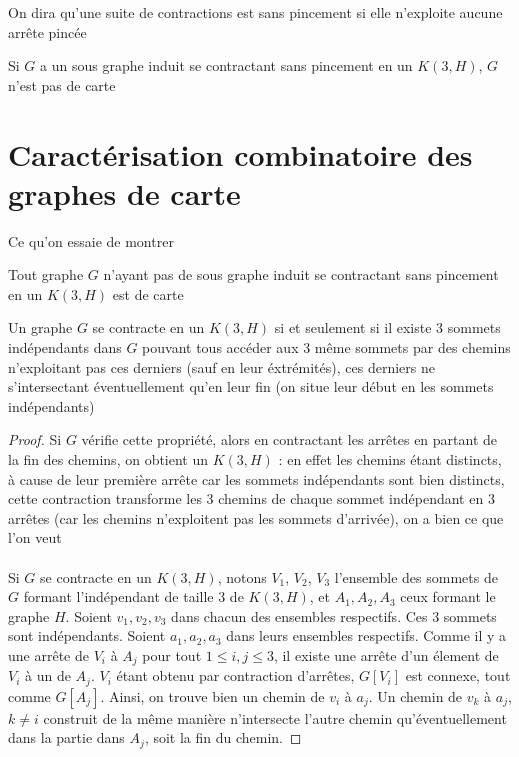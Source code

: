 \documentclass{scrartcl}
\begin{document}
\begin{flushleft}
On dira qu'une suite de contractions est sans pincement si elle n'exploite aucune arrête pincée

\begin{cor}
    Si $G$ a un sous graphe induit se contractant sans pincement en un $K(3, H)$, $G$ n'est pas de carte
\end{cor}

\section{Caractérisation combinatoire des graphes de carte}

Ce qu'on essaie de montrer

\begin{conj}
    Tout graphe $G$ n'ayant pas de sous graphe induit se contractant sans pincement en un $K(3, H)$ est de carte
\end{conj}

\begin{lem}
    Un graphe $G$ se contracte en un $K(3, H)$ si et seulement si il existe $3$ sommets
    indépendants dans $G$ pouvant tous accéder aux $3$ même sommets par des chemins n'exploitant pas ces derniers (sauf en
    leur éxtrémités), ces derniers ne s'intersectant éventuellement qu'en leur fin (on situe leur début en les sommets indépendants)
\end{lem}

\begin{proof}
    Si $G$ vérifie cette propriété, alors en contractant les arrêtes en partant de la fin des chemins, on obtient un $K(3, H)$ : en
    effet les chemins étant distincts, à cause de leur première arrête car les sommets indépendants sont bien distincts,
    cette contraction transforme les $3$ chemins de chaque sommet indépendant en $3$ arrêtes (car les chemins n'exploitent pas les sommets
    d'arrivée), on a bien ce que l'on veut
    \\~\\
    Si $G$ se contracte en un $K(3, H)$, notons $V_1$, $V_2$, $V_3$ l'ensemble des sommets de $G$ formant l'indépendant
    de taille $3$ de $K(3, H)$, et $A_1, A_2, A_3$ ceux formant le graphe $H$. Soient $v_1, v_2, v_3$ dans chacun des ensembles respectifs.
    Ces $3$ sommets sont indépendants. Soient $a_1, a_2, a_3$ dans leurs ensembles respectifs. Comme il y a une arrête de $V_i$ à $A_j$
    pour tout $1 \leq i,j \leq 3$, il existe une arrête d'un élement de $V_i$ à un de $A_j$. $V_i$ étant obtenu par contraction d'arrêtes,
    $G[V_i]$ est connexe, tout comme $G[A_j]$. Ainsi, on trouve bien un chemin de $v_i$ à $a_j$. Un chemin de $v_k$ à $a_j$, $k \neq i$ construit
    de la même manière n'intersecte l'autre chemin qu'éventuellement dans la partie dans $A_j$, soit la fin du chemin.
\end{proof}


\end{flushleft}
\end{document}
